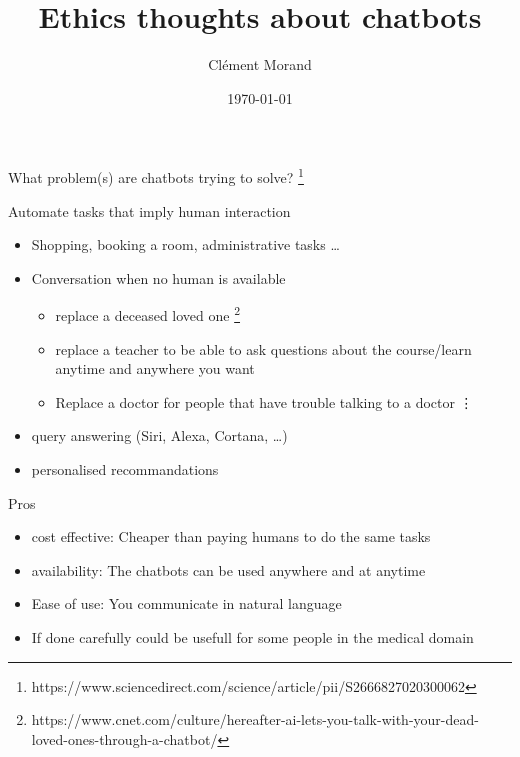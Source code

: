 \documentclass[11pt, aspectratio=169,]{beamer}
\title{Ethics thoughts about chatbots}
\author{Clément Morand}
\date{\today}
\begin{document}
\begin{frame}
	\titlepage
\end{frame}


\begin{frame}{What problem(s) are chatbots trying to solve? \footnote{https://www.sciencedirect.com/science/article/pii/S2666827020300062}}
\begin{block}{Automate tasks that imply human interaction}
    \begin{itemize}
        \item Shopping, booking a room, administrative tasks \dots
        \item Conversation when no human is available
            \begin{itemize}
                \item replace a deceased loved one \footnote{https://www.cnet.com/culture/hereafter-ai-lets-you-talk-with-your-dead-loved-ones-through-a-chatbot/}
                \item replace a teacher to be able to ask questions about the course/learn anytime and anywhere you want
                \item Replace a doctor for people that have trouble talking to a doctor
                \vdots
            \end{itemize}
        \item query answering (Siri, Alexa, Cortana, \dots)
        \item personalised recommandations
    \end{itemize}
\end{block}

\end{frame}

\begin{frame}{Pros}
    \begin{itemize}
        \item cost effective: Cheaper than paying humans to do the same tasks
        \item availability: The chatbots can be used anywhere and at anytime
        \item Ease of use: You communicate in natural language
        \item If done carefully could be usefull for some people in the medical domain
    \end{itemize}
\end{frame}
\end{document}
